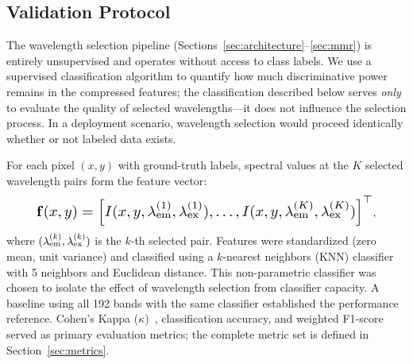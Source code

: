 \subsection{Validation Protocol}
\label{sec:validation}

The wavelength selection pipeline (Sections~\ref{sec:architecture}--\ref{sec:mmr}) is entirely unsupervised and operates without access to class labels.
We use a supervised classification algorithm to quantify how much discriminative power remains in the compressed features; the classification described below serves \emph{only} to evaluate the quality of selected wavelengths---it does not influence the selection process.
In a deployment scenario, wavelength selection would proceed identically whether or not labeled data exists.

For each pixel $(x, y)$ with ground-truth labels, spectral values at the $K$ selected wavelength pairs form the feature vector:
\begin{equation}
\resizebox{0.88\columnwidth}{!}{$
\vect{f}(x, y) = \left[ I(x, y, \lambda_{\mathrm{em}}^{(1)}, \lambda_{\mathrm{ex}}^{(1)}), \ldots, I(x, y, \lambda_{\mathrm{em}}^{(K)}, \lambda_{\mathrm{ex}}^{(K)}) \right]^\top$},
\label{eq:features}
\end{equation}
where $(\lambda_{\text{em}}^{(k)}, \lambda_{\text{ex}}^{(k)})$ is the $k$-th selected pair.
Features were standardized (zero mean, unit variance) and classified using a $k$-nearest neighbors (KNN) classifier~\cite{cover1967nearest} with 5 neighbors and Euclidean distance.
This non-parametric classifier was chosen to isolate the effect of wavelength selection from classifier capacity.
A baseline using all 192 bands with the same classifier established the performance reference.
Cohen's Kappa ($\kappa$)~\cite{cohen1960coefficient}, classification accuracy, and weighted F1-score served as primary evaluation metrics; the complete metric set is defined in Section~\ref{sec:metrics}.